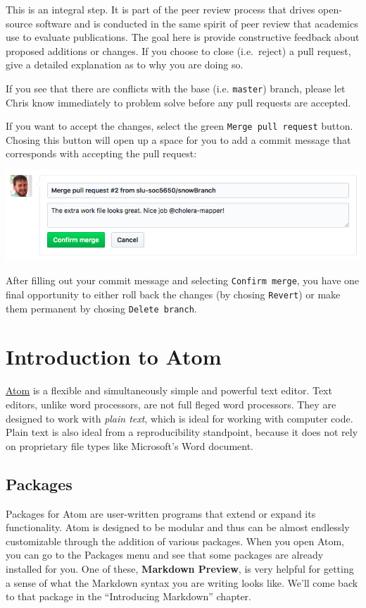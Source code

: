 \documentclass[]{book}
\theoremstyle{definition}
\theoremstyle{definition}
\theoremstyle{remark}
\begin{document}
This is an integral step. It is part of the peer review process that
drives open-source software and is conducted in the same spirit of peer
review that academics use to evaluate publications. The goal here is
provide constructive feedback about proposed additions or changes. If
you choose to close (i.e.~reject) a pull request, give a detailed
explanation as to why you are doing so.

If you see that there are conflicts with the base (i.e. \texttt{master})
branch, please let Chris know immediately to problem solve before any
pull requests are accepted.

If you want to accept the changes, select the green
\texttt{Merge\ pull\ request} button. Chosing this button will open up a
space for you to add a commit message that corresponds with accepting
the pull request:

\includegraphics[width=1\linewidth]{images/branch8}

After filling out your commit message and selecting
\texttt{Confirm\ merge}, you have one final opportunity to either roll
back the changes (by chosing \texttt{Revert}) or make them permanent by
chosing \texttt{Delete\ branch}.

\chapter{Introduction to Atom}\label{introduction-to-atom}

\href{https://atom.io}{Atom} is a flexible and simultaneously simple and
powerful text editor. Text editors, unlike word processors, are not full
fleged word processors. They are designed to work with \emph{plain
text}, which is ideal for working with computer code. Plain text is also
ideal from a reproducibility standpoint, because it does not rely on
proprietary file types like Microsoft's Word document.

\section{Packages}\label{packages}

Packages for Atom are user-written programs that extend or expand its
functionality. Atom is designed to be modular and thus can be almost
endlessly customizable through the addition of various packages. When
you open Atom, you can go to the Packages menu and see that some
packages are already installed for you. One of these, \textbf{Markdown
Preview}, is very helpful for getting a sense of what the Markdown
syntax you are writing looks like. We'll come back to that package in
the ``Introducing Markdown'' chapter.
\end{document}
